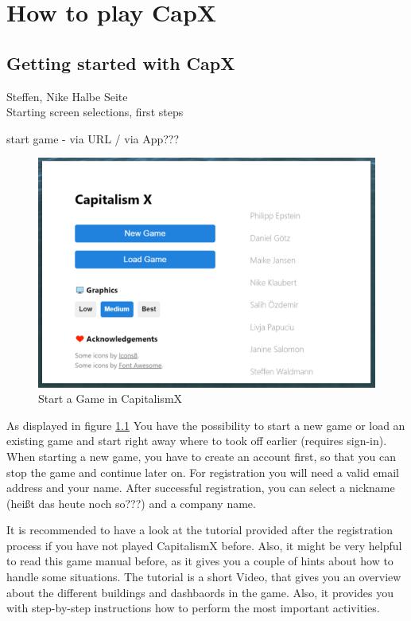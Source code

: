 \documentclass[11pt,titlepage,oneside,openany]{book}
\begin{document}


\chapter{How to play CapX}

\section{Getting started with CapX}
Steffen, Nike Halbe Seite\\

Starting screen selections, first steps

start game - via URL / via App???

\begin{figure} [!htbp]
    \centering
    \includegraphics [width=\textwidth] {images/startingScreen.png}
    \caption{Start a Game in CapitalismX}
    \label{fig:startingScreen}
\end{figure}

As displayed in figure \ref{fig:startingScreen} You have the possibility to start a new game or load an existing game and start right away where to took off earlier (requires sign-in). When starting a new game, you have to create an account first, so that you can stop the game and continue later on. For registration you will need a valid email address and your name. After successful registration, you can select a nickname (heißt das heute noch so???) and a company name. 

It is recommended to have a look at the tutorial provided after the registration process if you have not played CapitalismX before. Also, it might be very helpful to read this game manual before, as it gives you a couple of hints about how to handle some situations. The tutorial is a short Video, that gives you an overview about the different buildings and dashbaords in the game. Also, it provides you with step-by-step instructions how to perform the most important activities.
\end{document}
